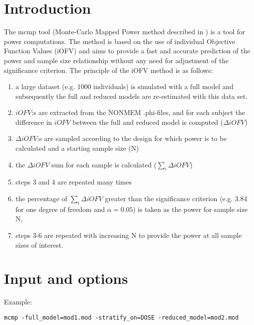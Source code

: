 
\usepackage{hyperref}



\maketitle
\newcommand{\guidetoolname}{mcmp}
\tableofcontents
\newpage

\section{Introduction}
The mcmp tool (Monte-Carlo Mapped Power method described in \cite{Vong}) is a tool for power computations.
The method is based on the use of individual Objective Function Values (iOFV) and aims to provide a fast and accurate prediction of the power and sample size relationship without any need for adjustment of the significance criterion.
The principle of the iOFV method is as follows:
\begin{enumerate}
\item a large dataset (e.g. 1000 individuals) is simulated with a full model and subsequently the full and reduced models are re-estimated with this data set. 
\item $iOFV$:s are extracted from the NONMEM .phi-files, and for each subject the difference in $iOFV$ between the full and reduced model is computed ($\Delta iOFV$)
\item $\Delta iOFV$:s are sampled according to the design for which power is to be calculated and a starting sample size (N)
\item the $\Delta iOFV$ sum for each sample is calculated ($\sum_i{\Delta iOFV}$) 
\item steps 3 and 4 are repeated many times 
\item the percentage of $\sum_i{\Delta iOFV}$ greater than the significance criterion (e.g. 3.84 for one degree of freedom and $\alpha=0.05$) is taken as the power for sample size N, 
\item steps 3-6 are repeated with increasing N to provide the power at all sample sizes of interest.
\end{enumerate}

\section{Input and options}

\noindent Example:
\begin{verbatim}
mcmp -full_model=mod1.mod -stratify_on=DOSE -reduced_model=mod2.mod 
\end{verbatim}


